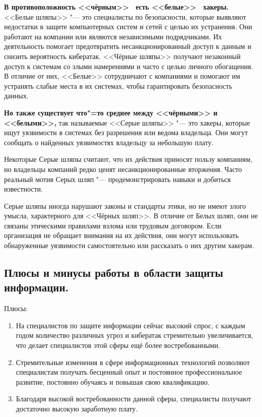 \textbf{В противоположность <<чёрным>> \ есть <<белые>> \  хакеры.} <<Белые шляпы>> "---  это специалисты по безопасности, которые выявляют недостатки в защите компьютерных систем и сетей с целью их устранения. Они работают на компании или являются независимыми 
подрядчиками. Их деятельность помогает предотвратить несанкционированный доступ к данным и снизить вероятность кибератак.
<<Чёрные шляпы>> получают незаконный доступ к системам со злыми намерениями и часто с целью личного обогащения. В отличие от 
них, <<Белые>> сотрудничают с компаниями и помогают им устранять слабые места в их системах, чтобы гарантировать 
безопасность данных.

\textbf{Но также существует что"=то среднее между <<чёрными>> и <<белыми>>,} так называемые <<Серые шляпы>> "---  это хакеры, которые ищут 
уязвимости в системах без разрешения или ведома владельца. Они могут сообщать о найденных уязвимостях владельцу за небольшую 
плату.

Некоторые Серые шляпы считают, что их действия приносят пользу компаниям, но владельцы компаний редко ценят 
несанкционированные вторжения. Часто реальный мотив Серых шляп "---  продемонстрировать навыки и добиться известности.

Серые шляпы иногда нарушают законы и стандарты этики, но не имеют злого умысла, характерного для <<Чёрных шляп>>. В отличие от 
Белых шляп, они не связаны этическими правилами взлома или трудовым договором. Если организация не обращает внимания на их 
действия, они могут использовать обнаруженные уязвимости самостоятельно или рассказать о них другим хакерам\cite{kaspersky}.


\newpage
\subsection{Плюсы и минусы работы в области защиты информации.}
Плюсы:
\begin{enumerate}
    \item На специалистов по защите информации сейчас высокий спрос, с каждым годом количество различных угроз и кибератак 
    стремительно увеличивается, что делает специалистов этой сферы ещё более востребованными.
    \item Стремительные изменения в сфере информационных технологий позволяют специалистам получать бесценный опыт и 
    постоянное профессиональное развитие, постоянно обучаясь и повышая свою квалификацию.
    \item Благодаря высокой востребованности данной сферы, специалисты получают достаточно высокую заработную плату.
\end{enumerate}
 
